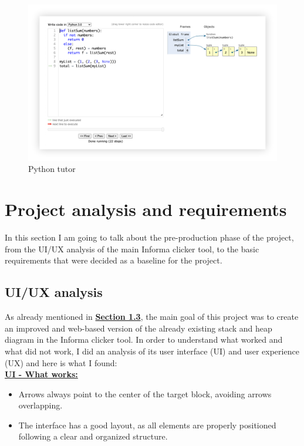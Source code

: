 \documentclass[]{usiinfbachelorproject}
\begin{document}
\begin{figure}[h!]
\centering
\includegraphics[scale=0.168]{figures/python_tutor}
\caption {Python tutor}
\end{figure}

\vspace{\fill}
\pagebreak

\section{Project analysis and requirements} \label{requirements+analysis}

In this section I am going to talk about the pre-production phase of the project, from the UI/UX analysis of the main Informa clicker tool, to the basic requirements that were decided as a baseline for the project.

\subsection{UI/UX analysis}

As already mentioned in \hyperref[goal]{\textbf{Section 1.3}}, the main goal of this project was to create an improved and web-based version of the already existing stack and heap diagram in the Informa clicker tool. In order to understand what worked and what did not work, I did an analysis of its user interface (UI) and user experience (UX) and here is what I found:\\

\textbf{\ul{UI - What works:}}

\begin{itemize}
	\item Arrows always point to the center of the target block, avoiding arrows overlapping.
	\item The interface has a good layout, as all elements are properly positioned following a clear and organized structure.
\end{itemize}\
\end{document}
